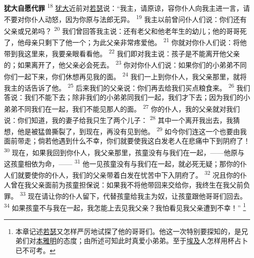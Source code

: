 \textbf{犹大自愿代罪\quad}
\textsuperscript{18}
\uline{犹大}近前对\uline{若瑟}说：“我主，请原谅，容你仆人向我主进一言，请不要对你仆人动怒，因为你原与法郎无异。
\textsuperscript{19}
我主以前曾问仆人们说：你们还有父亲或兄弟吗？
\textsuperscript{20}
我们曾回答我主说：还有老父和他老年生的幼儿；他的哥哥死了，他母亲只剩下了他一个；为此父亲非常疼爱他。
\textsuperscript{21}
你就对你仆人们说：将他带到我这里来，我要亲眼看看他。
\textsuperscript{22}
我们即对我主说：孩子是不能离开他父亲的；如果离开了，他父亲必会死去。
\textsuperscript{23}
你对你仆人们说：如果你们的小弟弟不同你们一起下来，你们休想再见我的面。
\textsuperscript{24}
我们一上到你仆人，我父亲那里，就将我主的话告诉了他。
\textsuperscript{25}
后来我们的父亲说：你们再去给我们买点粮食来。
\textsuperscript{26}
我们答说：我们不能下去；除非我们的小弟弟同我们一起，我们才下去；因为我们的小弟弟不同我们在一起，我们不能见那人的面。
\textsuperscript{27}
你的仆人，我的父亲就对我们说：你们知道，我的妻子给我只生了两个儿子：
\textsuperscript{28}
其中一个离开我出去，我猜想，他是被猛兽撕裂了，到现在，再没有见到他。
\textsuperscript{29}
如今你们连这一个也要由我面前带走；倘若他遇到什么不幸，你们就要使我这白发老人在悲痛中下到阴府了！
\textsuperscript{30}
现在，如果我回到你仆人，我父亲那里，孩童没有与我们在一起，——他原与这孩童相依为命，——
\textsuperscript{31}
他一见孩童没有与我们在一起，就必死无疑；那你的仆人们就要使你的仆人，我们的父亲带着白发在忧苦中下入阴府了。
\textsuperscript{32}
况且你的仆人曾在我父亲面前为孩童担保说：如果我不将他带回来交给你，我终生在我父前负罪。
\textsuperscript{33}
现在请让你的仆人留下，代替孩童给我主为奴，让孩童跟他哥哥们回去。
\textsuperscript{34}
如果孩童不与我在一起，我怎能上去见我父亲？我怕看见我父亲遭到不幸！”
\footnote{本章记述\uline{若瑟}又怎样严厉地试探了他的哥哥们。他这一次特别要探知的，是兄弟们对\uline{本雅明}的态度；由所述可知此时真爱小弟弟。至于\uline{埃及}人怎样用杯占卜已不可考。}


